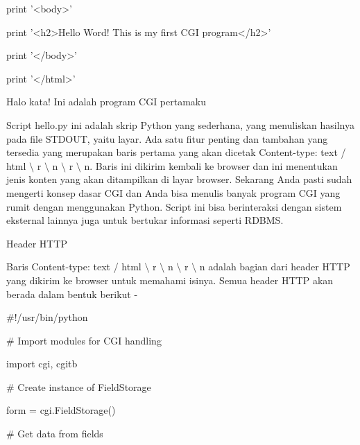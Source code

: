 \noindent 
print '<body>' \par
\noindent 
print '<h2>Hello Word! This is my first CGI program</h2>' \par
\noindent 
print '</body>' \par
\noindent 
print '</html>' \par
\vspace{12pt}
\vspace{12pt}
\noindent 
Halo kata! Ini adalah program CGI pertamaku \par
\vspace{12pt}
Script hello.py ini adalah skrip Python yang sederhana, yang menuliskan hasilnya pada file STDOUT, yaitu layar. Ada satu fitur penting dan tambahan yang tersedia yang merupakan baris pertama yang akan dicetak Content-type: text / html  $  \setminus  $ r  $  \setminus  $ n  $  \setminus  $ r  $  \setminus  $ n. Baris ini dikirim kembali ke browser dan ini menentukan jenis konten yang akan ditampilkan di layar browser. Sekarang Anda pasti sudah mengerti konsep dasar CGI dan Anda bisa menulis banyak program CGI yang rumit dengan menggunakan Python. Script ini bisa berinteraksi dengan sistem eksternal lainnya juga untuk bertukar informasi seperti RDBMS. \par
\vspace{12pt}
\vspace{12pt}
\vspace{12pt}
\vspace{12pt}
\noindent 
Header HTTP \par
\vspace{12pt}
\noindent 
Baris Content-type: text / html  $  \setminus  $ r  $  \setminus  $ n  $  \setminus  $ r  $  \setminus  $ n adalah bagian dari header HTTP yang dikirim ke browser untuk memahami isinya. Semua header HTTP akan berada dalam bentuk berikut - \par
\noindent 
 $  \#  $!/usr/bin/python \par
\vspace{12pt}
\noindent 
 $  \#  $ Import modules for CGI handling  \par
\noindent 
import cgi, cgitb  \par
\vspace{12pt}
\noindent 
 $  \#  $ Create instance of FieldStorage  \par
\noindent 
form = cgi.FieldStorage()  \par
\vspace{12pt}
\noindent 
 $  \#  $ Get data from fields \par
